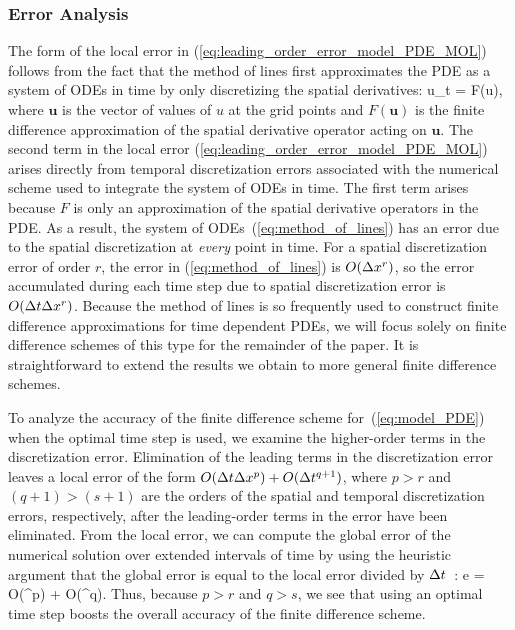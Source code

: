 \documentclass[fleqn,12pt,twoside]{article}
\begin{document}
\subsubsection*{\label{sec:error_analysis} 
            Error Analysis}
The form of the local error in 
(\ref{eq:leading_order_error_model_PDE_MOL}) follows from the fact 
that the method of lines first approximates the PDE as a system of ODEs in 
time by only discretizing the spatial derivatives: 
\beq
{\mathbf u}_t = F({\mathbf u}),
\label{eq:method_of_lines}
\eeq
where ${\mathbf u}$ is the vector of values of $u$ at the grid points and
$F({\mathbf u})$ is the finite difference approximation of the spatial 
derivative operator acting on ${\mathbf u}$.  The second term in the local 
error (\ref{eq:leading_order_error_model_PDE_MOL}) arises directly from 
temporal discretization errors associated with the numerical scheme used to 
integrate the system of ODEs in time.  The first term arises because $F$ is 
only an approximation of the spatial derivative operators in the PDE.  As a 
result, the system of ODEs~(\ref{eq:method_of_lines}) has an error due to 
the spatial discretization at \emph{every} point in time.  For a spatial 
discretization error of order $r$, the error in (\ref{eq:method_of_lines}) is 
$O(\Delta x^r)$, so the error accumulated during each time step due to 
spatial discretization error is $O(\Delta t \Delta x^r)$.  Because the method of 
lines is so frequently used to construct finite difference approximations for 
time dependent PDEs, we will focus solely on finite difference schemes of this 
type for the remainder of the paper.  It is straightforward to extend the 
results we obtain to more general finite difference schemes. 

To analyze the accuracy of the finite difference scheme 
for~(\ref{eq:model_PDE}) when the optimal time step is used, we examine the 
higher-order terms in the discretization error.  Elimination of the leading 
terms in the discretization error leaves a local error of the form 
$O(\Delta t \Delta x^p) + O(\Delta t^{q+1})$, where $p>r$ and $(q+1) > (s+1)$ are the orders 
of the spatial and temporal discretization errors, respectively, after the 
leading-order terms in the error have been eliminated.  
From the local error, we can compute the global error of the numerical 
solution over extended intervals of time by using the heuristic 
argument that the global error is equal to the local error divided by 
$\Delta t$~\cite{gko_book}:
\beq
e = O(\dx^p) + O(\dt^q).
\label{eq:global_error_ots}
\eeq
Thus, because $p > r$ and $q > s$, we see that using an optimal time step 
boosts the overall accuracy of the finite difference scheme.
\end{document}
